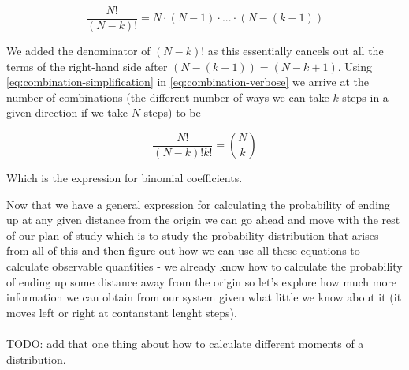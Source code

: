 \begin{equation}
\frac{N!}{(N-k)!} = 
N \cdot (N-1) \cdot ... \cdot (N - (k-1)) \label{eq:combination-simplification}
\end{equation}

We added the denominator of $(N-k)!$ as this essentially cancels out all the terms of the right-hand side after $(N-(k-1)) = (N-k+1)$.
Using \eqref{eq:combination-simplification} in \eqref{eq:combination-verbose} we arrive at the number of combinations (the different number of ways we can take $k$ steps in a given direction if we take $N$ steps) to be

\begin{equation}
\frac{N!}{(N-k)! k!} 
= \binom{N}{k}
\end{equation}

Which is the expression for binomial coefficients.

Now that we have a general expression for calculating the probability of ending up at any given distance from the origin we can go ahead and move with the rest of our plan of study which is to study the probability distribution that arises from all of this and then figure out how we can use all these equations to calculate observable quantities - we already know how to calculate the probability of ending up some distance away from the origin so let's explore how much more information we can obtain from our system given what little we know about it (it moves left or right at contanstant lenght steps).
\\~\\

TODO: add that one thing about how to calculate different moments of a distribution.\cite{reiff}